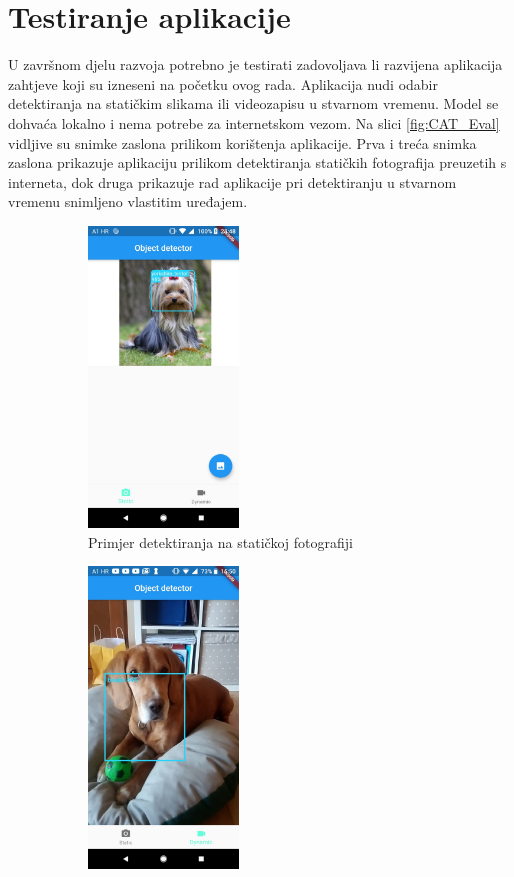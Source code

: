 \section{Testiranje aplikacije}
U završnom djelu razvoja potrebno je testirati zadovoljava li razvijena aplikacija zahtjeve koji su izneseni na početku ovog rada. Aplikacija nudi odabir 
detektiranja na statičkim slikama ili videozapisu u stvarnom vremenu. Model se dohvaća lokalno i nema potrebe za internetskom vezom.
Na slici \ref{fig:CAT_Eval} vidljive su snimke zaslona prilikom korištenja aplikacije. 
Prva i treća snimka zaslona prikazuje aplikaciju prilikom detektiranja statičkih fotografija preuzetih s interneta, dok druga prikazuje rad aplikacije pri detektiranju u stvarnom vremenu snimljeno vlastitim uređajem.


\begin{figure}[htb]
    \begin{subfigure}{.3\textwidth}
        \centering
        \includegraphics[height=8cm]{img/app-test-yorkie.jpeg}
        \caption{Primjer detektiranja na statičkoj fotografiji}
        \label{App-yorkie}
    \end{subfigure}
    \begin{subfigure}{.3\textwidth}
        \centering
        \includegraphics[height=8cm]{img/app-test-beagle.jpeg}

\end{subfigure}
\end{figure}
